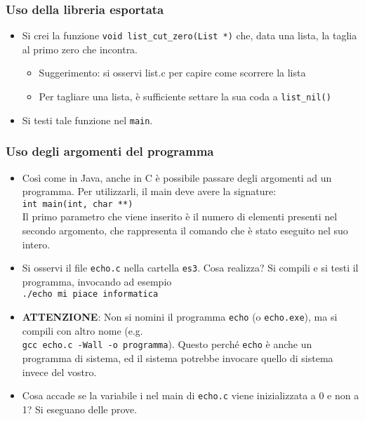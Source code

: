 \documentclass{beamer}
\begin{document}
\begin{frame}[fragile]
\frametitle{Uso della libreria esportata}
\begin{itemize}
 \item Si crei la funzione \texttt{void list\_cut\_zero(List *)} che, data una lista, la taglia al primo zero che incontra.
  \begin{itemize}
    \item Suggerimento: si osservi list.c per capire come scorrere la lista
    \item Per tagliare una lista, è sufficiente settare la sua coda a \texttt{list\_nil()}
  \end{itemize}
 \item Si testi tale funzione nel \texttt{main}.
\end{itemize}
\end{frame}

\begin{frame}[fragile]
\frametitle{Uso degli argomenti del programma}
\begin{itemize}
 \item Così come in Java, anche in C è possibile passare degli argomenti ad un programma. Per utilizzarli, il main deve avere la signature: \\ \texttt{int main(int, char **)}\\ Il primo parametro che viene inserito è il numero di elementi presenti nel secondo argomento, che rappresenta il comando che è stato eseguito nel suo intero.
 \item Si osservi il file \texttt{echo.c} nella cartella \texttt{es3}. Cosa realizza? Si compili e si testi il programma, invocando ad esempio \\\texttt{./echo mi piace informatica}
 \item \textbf{ATTENZIONE}: Non si nomini il programma \texttt{echo} (o \texttt{echo.exe}), ma si compili con altro nome (e.g. \\ \texttt{gcc echo.c -Wall -o programma}). Questo perché \texttt{echo} è anche un programma di sistema, ed il sistema potrebbe invocare quello di sistema invece del vostro.
 \item Cosa accade se la variabile i nel main di \texttt{echo.c} viene inizializzata a 0 e non a 1? Si eseguano delle prove.
\end{itemize}
\end{frame}
\end{document}
